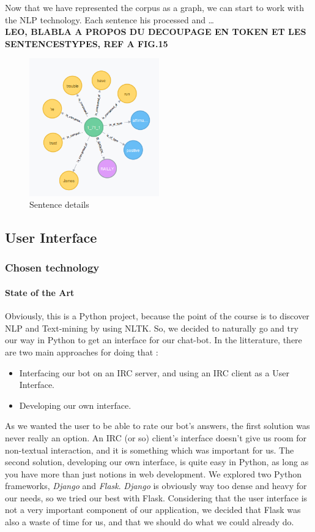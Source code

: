 Now that we have represented the corpus as a graph, we can start to work with the NLP technology. Each sentence his processed and \dots \\
\textbf{LEO, BLABLA A PROPOS DU DECOUPAGE EN TOKEN ET LES SENTENCESTYPES, REF A FIG.15}
\begin{figure}[!h]
\begin{center}
\includegraphics[width=0.5\textwidth]{./img/graph1711.png}
\end{center}
\caption{Sentence details}
\label{fig:sent}
\end{figure}

%
\subsection{User Interface}
\subsubsection{Chosen technology}
\label{subs:Technology}

\paragraph{State of the Art}
\label{par:SotA}
Obviously, this is a Python project, because the point of the course is to discover NLP and Text-mining by using NLTK.
So, we decided to naturally go and try our way in Python to get an interface for our chat-bot.
In the litterature, there are two main approaches for doing that :
\begin{itemize}
    \item Interfacing our bot on an IRC server, and using an IRC client as a User Interface.
    \item Developing our own interface.
\end{itemize}
As we wanted the user to be able to rate our bot's answers, the first solution was never really an option.
An IRC (or so) client's interface doesn't give us room for non-textual interaction, and it is something which was important for us.
The second solution, developing our own interface, is quite easy in Python, as long as you have more than just notions in web development.
We explored two Python frameworks, \textit{Django} and \textit{Flask}.
\textit{Django} is obviously way too dense and heavy for our needs, so we tried our best with Flask.
Considering that the user interface is not a very important component of our application, we decided that Flask was also a waste of time for us, and that we should do what we could already do.

